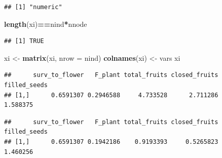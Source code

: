 \documentclass[
]{article}
\newenvironment{Shaded}{\begin{snugshade}}{\end{snugshade}}
\newcommand{\AttributeTok}[1]{\textcolor[rgb]{0.13,0.29,0.53}{#1}}
\newcommand{\CommentTok}[1]{\textcolor[rgb]{0.56,0.35,0.01}{\textit{#1}}}
\newcommand{\ConstantTok}[1]{\textcolor[rgb]{0.56,0.35,0.01}{#1}}
\newcommand{\FunctionTok}[1]{\textcolor[rgb]{0.13,0.29,0.53}{\textbf{#1}}}
\newcommand{\NormalTok}[1]{#1}
\newcommand{\OtherTok}[1]{\textcolor[rgb]{0.56,0.35,0.01}{#1}}
\newcommand{\SpecialCharTok}[1]{\textcolor[rgb]{0.81,0.36,0.00}{\textbf{#1}}}
\begin{document}
\begin{verbatim}
## [1] "numeric"
\end{verbatim}

\begin{Shaded}
\begin{Highlighting}[]
\FunctionTok{length}\NormalTok{(xi)}\SpecialCharTok{==}\NormalTok{nind}\SpecialCharTok{*}\NormalTok{nnode}
\end{Highlighting}
\end{Shaded}

\begin{verbatim}
## [1] TRUE
\end{verbatim}

\begin{Shaded}
\begin{Highlighting}[]
\NormalTok{xi }\OtherTok{\textless{}{-}} \FunctionTok{matrix}\NormalTok{(xi, }\AttributeTok{nrow =}\NormalTok{ nind)}
\FunctionTok{colnames}\NormalTok{(xi) }\OtherTok{\textless{}{-}}\NormalTok{ vars}
\NormalTok{xi}
\end{Highlighting}
\end{Shaded}

\begin{verbatim}
##      surv_to_flower   F_plant total_fruits closed_fruits filled_seeds
## [1,]      0.6591307 0.2946588     4.733528      2.711286     1.588375
\end{verbatim}

\begin{Shaded}
\end{Shaded}

\begin{verbatim}
##      surv_to_flower   F_plant total_fruits closed_fruits filled_seeds
## [1,]      0.6591307 0.1942186    0.9193393     0.5265823     1.460256
\end{verbatim}
\end{document}

